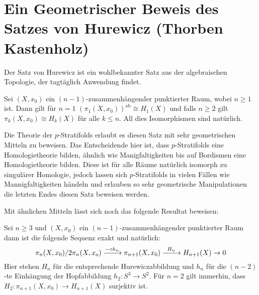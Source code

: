 \section{Ein Geometrischer Beweis des Satzes von Hurewicz
(Thorben Kastenholz)}

Der Satz von Hurewicz ist ein wohlbekannter Satz aus der algebraischen
Topologie, der tagtäglich Anwendung findet.

\begin{satz}
Sei $(X,x_0)$ ein $(n-1)$-zusammenhängender punktierter Raum, wobei $n\geq 1$
ist. Dann gilt für $n=1$ $(\pi_1(X,x_0))^{\mathrm{ab}} \cong H_1(X)$ und falls
$n \geq 2$ gilt $\pi_k(X,x_0) \cong H_k(X)$ für alle $k\leq n$. All dies
Isomorphismen sind natürlich.
\end{satz}

Die Theorie der $p$-Stratifolds erlaubt es diesen Satz mit sehr geometrischen
Mitteln zu beweisen. Das Entscheidende hier ist, dass $p$-Stratifolds eine
Homologietheorie bilden, ähnlich wie Manigfaltigkeiten bis auf Bordismen eine
Homologietheorie bilden. Diese ist für alle Räume natürlich isomorph zu
singulärer Homologie, jedoch lassen sich $p$-Stratifolds in vielen Fällen wie
Mannigfaltigkeiten händeln und erlauben so sehr geometrische Manipulationen
die letzten Endes diesen Satz beweisen werden.

Mit ähnlichen Mitteln lässt sich noch das folgende Resultat beweisen:
\begin{satz}
Sei $n \geq 3$ und $(X,x_0)$ ein $(n-1)$-zusammenhängender punktierter Raum
dann ist die folgende Sequenz exakt und natürlich:
\[
\pi_n(X,x_0)/2\pi_n(X,x_o) \xrightarrow{- \circ h_n} \pi_{n+1}(X,x_0)
\xrightarrow{\hspace{1ex} H_n \hspace{1ex}} H_{n+1}(X) \xrightarrow{} 0
\]
Hier stehen $H_n$ für die entsprechende Hurewiczabbildung und $h_n$ für die
$(n-2)$-te Einhängung der Hopfabbildung $h_2 \colon S^3 \to S^2$. Für $n = 2$
gilt immerhin, dass $H_2 \colon \pi_{n+1}(X,x_0) \to H_{n+1}(X)$ surjektiv ist.
\end{satz}
